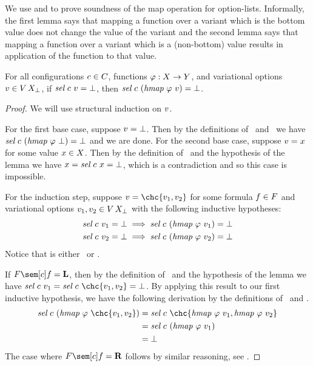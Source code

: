 We use  and  to prove soundness of the map operation for option-lists.
Informally, the first lemma says that mapping a function over a variant which is the bottom value does not change the value of the variant and the second lemma says that mapping a function over a variant which is a (non-bottom) value results in application of the function to that value.

\begin{lemma}
  \label{lem:vselnone}
  For all configurations $\color{black}c \in \color{black}C$, functions $\varphi : \color{black}X \to \color{black}Y$, and variational options $\color{black}v \in \color{black}V\,{\color{black}\color{black}X_{\color{black}\bot}}$, if
  $
    \color{black}\textit{sel}\ \color{black}c\ \color{black}v = \color{black}\bot
  $,
  then
  $
    \color{black}\textit{sel}\ \color{black}c\ (\color{black}\textit{hmap}\ \varphi\ \color{black}v) = \color{black}\bot
  $.
\end{lemma}

\begin{proof}
  We will use structural induction on $\color{black}v$.

  For the first base case, suppose $\color{black}v = \color{black}\bot$.
  Then by the definitions of \hmap\ and \sel\ we have $\color{black}\textit{sel}\ \color{black}c\ (\color{black}\textit{hmap}\ \varphi\ \color{black}\bot) = \color{black}\bot$ and we are done.
  For the second base case, suppose $\color{black}v = \color{black}x$ for some value $\color{black}x \in \color{black}X$.
  Then by the definition of \sel\ and the hypothesis of the lemma we have $\color{black}x = \color{black}\textit{sel}\ \color{black}c\ \color{black}x = \color{black}\bot$, which is a contradiction and so this case is impossible.

  For the induction step, suppose $\var = \chc{\var_1, \var_2}$ for some formula $\color{black}f \in \color{black}F$ and variational options $\color{black}v_1, \color{black}v_2 \in \color{black}V\,{\color{black}\color{black}X_{\color{black}\bot}}$ with the following inductive hypotheses:
  \begin{align*}
    \color{black}\textit{sel}\ \color{black}c\ \color{black}v_1 = \color{black}\bot &\implies
    \color{black}\textit{sel}\ \color{black}c\ (\color{black}\textit{hmap}\ \varphi\ \color{black}v_1) = \color{black}\bot \\
    \color{black}\textit{sel}\ \color{black}c\ \color{black}v_2 = \color{black}\bot &\implies
    \color{black}\textit{sel}\ \color{black}c\ (\color{black}\textit{hmap}\ \varphi\ \color{black}v_2) = \color{black}\bot
  \end{align*}
  Notice that \fSem[\cE]{\fE} is either \tagL\ or \tagR.

  If $\fSem[\cE]{\fE} = \tagL$, then by the definition of \sel\ and the hypothesis of the lemma we have $\sel\ \cE\ \var_1 = \sel\ \cE\ \chc{\var_1, \var_2} = \Bot$.
  By applying this result to our first inductive hypothesis, we have the following derivation by the definitions of \hmap\ and \sel.
  \begin{align*}
    \sel\ \cE\ (\hmap\ \varphi\ \chc{\var_1, \var_2})
    &= \sel\ \cE\ \chc{\hmap\ \varphi\ \var_1, \hmap\ \varphi\ \var_2} \\
    &= \sel\ \cE\ (\hmap\ \varphi\ \var_1) \\
    &= \Bot
  \end{align*}
  The case where $\fSem[\cE]{\fE} = \tagR$ follows by similar reasoning, see .
\end{proof}

